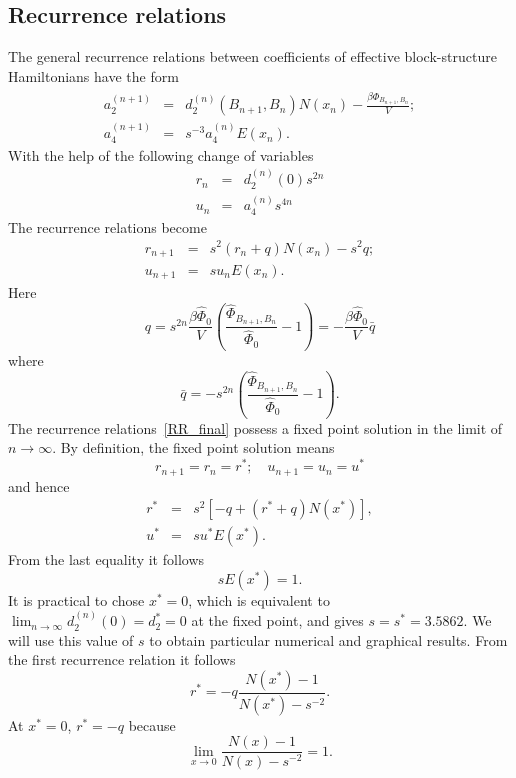 \subsection{Recurrence relations}
The general recurrence relations between coefficients of effective block-structure Hamiltonians have the form
\begin{eqnarray}
	a_2^{(n+1)} & = & d_2^{(n)}(B_{n+1}, B_n) N(x_n) - \frac{\beta\hat{\Phi}_{B_{n+1}, B_n}}{V};
	\\
	a_4^{(n+1)} & = & s^{-3} a_4^{(n)} E(x_{n}).
\end{eqnarray}
With the help of the following change of variables
\begin{eqnarray*}
	r_n & = & d_2^{(n)}(0)s^{2n}
	\nonumber \\
	u_n & = & a_4^{(n)}s^{4n}
	\nonumber
\end{eqnarray*}
The recurrence relations become
\begin{eqnarray}
	\label{RR_final}
	r_{n+1} & = & s^2(r_n + q) N(x_n) - s^2 q;
	\nonumber\\
	u_{n+1} & = & s u_n E(x_n).
\end{eqnarray}
Here
\begin{equation*}
	q = s^{2n} \frac{\beta \hat{\Phi}_0}{V} \left(\frac{\hat{\Phi}_{B_{n+1}, B_n}}{\hat{\Phi}_0} - 1\right) = -\frac{\beta \hat{\Phi}_0}{V} \bar{q}
\end{equation*}
where
\begin{equation}
	\bar{q} = -s^{2n} \left(\frac{\hat{\Phi}_{B_{n+1}, B_n}}{\hat{\Phi}_0} - 1\right).
\end{equation}
The recurrence relations~\eqref{RR_final} possess a fixed point solution in the limit of $n \to \infty$. By definition, the fixed point solution means
\begin{equation*}
	r_{n+1} = r_n = r^*; \quad u_{n+1} = u_n = u^*
\end{equation*}
and hence
\begin{eqnarray*}
	r^* & = & s^2[-q + (r^* + q)N(x^*)],
	\nonumber \\
	u^* & = & s u^* E(x^*).
\end{eqnarray*}
From the last equality it follows
\begin{equation}
	sE(x^*) = 1.
\end{equation}
It is practical to chose $x^* = 0$, which is equivalent to $\lim_{n \to \infty}d_2^{(n)}(0) = d_2^* = 0$ at the fixed point, and gives $s = s^* = 3.5862$. We will use this value of $s$ to obtain particular numerical and graphical results. From the first recurrence relation it follows
\begin{equation*}
	r^* = -q\frac{N(x^*) - 1}{N(x^*) - s^{-2}}.
\end{equation*}
At $x^* = 0$, $r^* = -q$ because 
$$
\lim_{x \to 0} \frac{N(x) -1}{N(x) - s^{-2}} = 1.
$$ 

